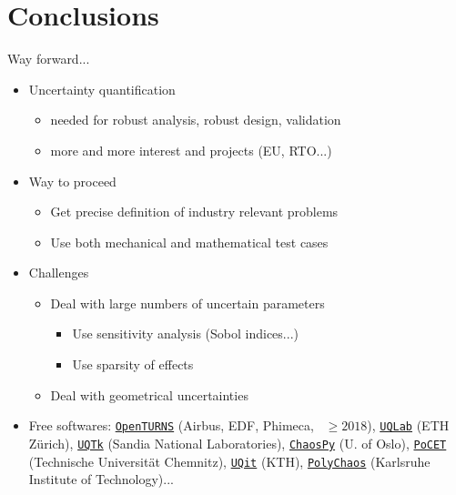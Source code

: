 \documentclass[10pt]{beamer}
\def\vf{\vspace{4mm}}
\def\begit{\begin{itemize}}
\def\endit{\end{itemize}}
\begin{document}
\section{Conclusions}

%
\begin{frame}{Way forward...}
%
\begit
% 
\item Uncertainty quantification
  \begit
  \item needed for robust analysis, robust design, validation 
  \item more and more interest and projects (EU, RTO...)
  \endit
%
\vf
\item Way to proceed
  \begit
  \item Get precise definition of industry relevant problems  
  \item Use both mechanical and mathematical test cases 
  \endit
\vf
\item Challenges
  \begit
  \item Deal with large numbers of uncertain parameters
     \begit
     \item Use sensitivity analysis (Sobol indices...)
     \item Use sparsity of effects
     \endit
  \item Deal with geometrical uncertainties 
  \endit
\vf
\item Free softwares: \href{http://www.openturns.org}{\texttt{OpenTURNS}} (Airbus, EDF, Phimeca, \Onera\ $\geq 2018$), \href{https://www.uqlab.com}{\texttt{UQLab}} (ETH Z\"urich), \href{https://www.sandia.gov/UQToolkit/}{\texttt{UQTk}} (Sandia National Laboratories), \href{https://github.com/jonathf/chaospy}{\texttt{ChaosPy}} (U. of Oslo), \href{https://www.tu-chemnitz.de/etit/control/research/PoCET/}{\texttt{PoCET}} (Technische Universit\"at Chemnitz), \href{https://github.com/KTH-Nek5000/UQit}{\texttt{UQit}} (KTH), \href{https://timueh.github.io/PolyChaos.jl/stable}{\texttt{PolyChaos}} (Karlsruhe Institute of Technology)...
\endit
%
\end{frame}


\end{document}
